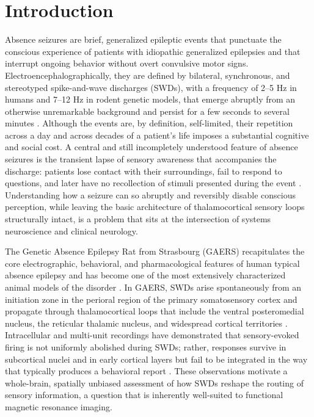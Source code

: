 \section{Introduction}

Absence seizures are brief, generalized epileptic events that punctuate the conscious experience of patients with idiopathic generalized epilepsies and that interrupt ongoing behavior without overt convulsive motor signs. Electroencephalographically, they are defined by bilateral, synchronous, and stereotyped spike-and-wave discharges (SWDs), with a frequency of 2--5 Hz in humans and 7--12 Hz in rodent genetic models, that emerge abruptly from an otherwise unremarkable background and persist for a few seconds to several minutes \citep{szaflarski2010,crunelli2002}. Although the events are, by definition, self-limited, their repetition across a day and across decades of a patient's life imposes a substantial cognitive and social cost. A central and still incompletely understood feature of absence seizures is the transient lapse of sensory awareness that accompanies the discharge: patients lose contact with their surroundings, fail to respond to questions, and later have no recollection of stimuli presented during the event \citep{blumenfeld2012,ferri2025}. Understanding how a seizure can so abruptly and reversibly disable conscious perception, while leaving the basic architecture of thalamocortical sensory loops structurally intact, is a problem that sits at the intersection of systems neuroscience and clinical neurology.

The Genetic Absence Epilepsy Rat from Strasbourg (GAERS) recapitulates the core electrographic, behavioral, and pharmacological features of human typical absence epilepsy and has become one of the most extensively characterized animal models of the disorder \citep{marescaux1992,danober1998}. In GAERS, SWDs arise spontaneously from an initiation zone in the perioral region of the primary somatosensory cortex and propagate through thalamocortical loops that include the ventral posteromedial nucleus, the reticular thalamic nucleus, and widespread cortical territories \citep{polack2007,meeren2002}. Intracellular and multi-unit recordings have demonstrated that sensory-evoked firing is not uniformly abolished during SWDs; rather, responses survive in subcortical nuclei and in early cortical layers but fail to be integrated in the way that typically produces a behavioral report \citep{chipaux2013}. These observations motivate a whole-brain, spatially unbiased assessment of how SWDs reshape the routing of sensory information, a question that is inherently well-suited to functional magnetic resonance imaging.

